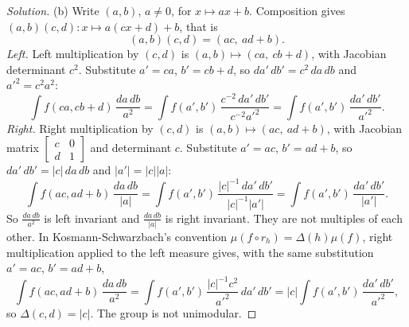 \begin{proof}[Solution]
(b) Write $(a,b)$, $a\ne0$, for $x\mapsto ax+b$. Composition gives
$(a,b)(c,d)\colon x\mapsto a(cx+d)+b$, that is
\begin{equation}
 (a,b)(c,d)=(ac,\ ad+b).
\end{equation}
\emph{Left.} Left multiplication by $(c,d)$ is
$(a,b)\mapsto(ca,\ cb+d)$, with Jacobian determinant $c^2$. Substitute
$a'=ca$, $b'=cb+d$, so $da'\,db'=c^2\,da\,db$ and $a'^2=c^2a^2$:
\begin{equation}
 \int f(ca,cb+d)\,\frac{da\,db}{a^2}
 =\int f(a',b')\,\frac{c^{-2}\,da'\,db'}{c^{-2}a'^2}
 =\int f(a',b')\,\frac{da'\,db'}{a'^2}.
\end{equation}
\emph{Right.} Right multiplication by $(c,d)$ is
$(a,b)\mapsto(ac,\ ad+b)$, with Jacobian matrix
$\begin{bmatrix}c&0\\d&1\end{bmatrix}$ and determinant $c$. Substitute
$a'=ac$, $b'=ad+b$, so $da'\,db'=|c|\,da\,db$ and $|a'|=|c||a|$:
\begin{equation}
 \int f(ac,ad+b)\,\frac{da\,db}{|a|}
 =\int f(a',b')\,\frac{|c|^{-1}\,da'\,db'}{|c|^{-1}|a'|}
 =\int f(a',b')\,\frac{da'\,db'}{|a'|}.
\end{equation}
So $\frac{da\,db}{a^2}$ is left invariant and $\frac{da\,db}{|a|}$ is right
invariant. They are not multiples of each other. In
Kosmann-Schwarzbach's convention $\mu(f\circ r_h)=\Delta(h)\mu(f)$, right
multiplication applied to the left measure gives, with the same substitution
$a'=ac$, $b'=ad+b$,
\begin{equation}
 \int f(ac,ad+b)\,\frac{da\,db}{a^2}
 =\int f(a',b')\,\frac{|c|^{-1}c^2}{a'^2}\,da'\,db'
 =|c|\int f(a',b')\,\frac{da'\,db'}{a'^2},
\end{equation}
so $\Delta(c,d)=|c|$. The group is not unimodular.
\end{proof}

